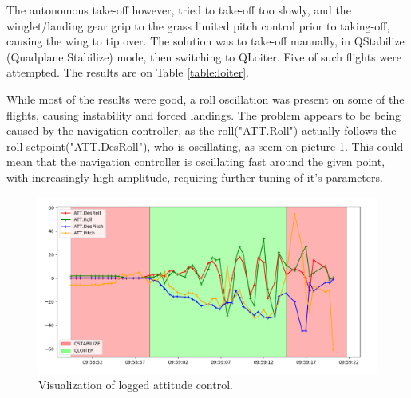 The autonomous take-off however, tried to take-off too slowly, and the winglet/landing gear grip to the grass limited pitch control prior to taking-off, causing the wing to tip over. The solution was to take-off manually, in QStabilize (Quadplane Stabilize) mode, then switching to QLoiter. Five of such flights were attempted. The results are on Table \ref{table:loiter}.

While most of the results were good, a roll oscillation was present on some of the flights, causing instability and forced landings.
The problem appears to be being caused by the navigation controller, as the roll("ATT.Roll") actually follows the roll setpoint("ATT.DesRoll"), who is oscillating, as seem on picture \ref{fig:rollOscillation}. This could mean that the navigation controller is oscillating fast around the given point, with increasingly high amplitude, requiring further tuning of it's parameters. 

	\begin{figure}
\centering
  \includegraphics[width=0.9\linewidth]{figs/rolloscillation.png}
  \caption{Visualization of logged attitude control.}
  \label{fig:rollOscillation}
\end{figure}
	


